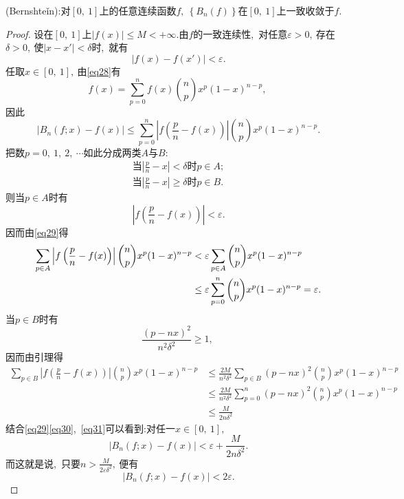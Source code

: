 \begin{theorem}
	(Bernshte\v{i}n):对$\left[0,\ 1\right]$上的任意连续函数$f,\ \left\{B_n(f)\right\}$在$\left[0,\ 1\right]$上一致收敛于$f.$
\end{theorem}
\begin{proof}
	设在$\left[0,\ 1\right]$上$|f(x)|\le M<+\infty.$由$f$的一致连续性,\ 对任意$\varepsilon>0,\ $存在$\delta>0,\ $使$|x-x'|<\delta$时,\ 就有
	$$|f(x)-f(x')|<\varepsilon.$$
	任取$x\in\left[0,\ 1\right],\ $由\eqref{eq28}有
	$$f(x)=\sum\limits_{p=0}^{n}f(x)\binom{n}{p}x^p(1-x)^{n-p},\ $$
	因此
	\begin{equation}
		\left|B_n(f;x)-f(x)\right|\le\sum_{p=0}^{n}\left|f\left(\frac{p}{n}-f(x)\right)\right|\binom{n}{p}x^p(1-x)^{n-p}.\label{eq29}
	\end{equation}
	把数$p=0,\ 1,\ 2,\ \cdots$如此分成两类$A$与$B:$
	\begin{align*}
		\text{当}\left|\frac{p}{n}-x\right|<\delta \text{时}p\in A;\\
		\text{当}\left|\frac{p}{n}-x\right|\ge\delta \text{时}p\in B.
	\end{align*}
	则当$p\in A$时有
	$$\left|f\left(\frac{p}{n}-f(x)\right)\right|<\varepsilon.$$
	因而由\eqref{eq29}得
	\begin{align}
		\sum\limits_{p\in A}^{}\left|f\left(\frac{p}{n}-f(x)\right)\right|\binom{n}{p}x^p(1-x)^{n-p}&<\varepsilon\sum\limits_{p\in A}^{}\binom{n}{p}x^p(1-x)^{n-p}{\nonumber}\\
		&\le\varepsilon\sum\limits_{p=0}^{n}\binom{n}{p}x^p(1-x)^{n-p}=\varepsilon.\label{eq30}
	\end{align}
	当$p\in B$时有
	$$\frac{(p-nx)^2}{n^2\delta^2}\ge 1,\ $$
	因而由引理得
	\begin{align}
		\sum\limits_{p\in B}^{}\left|f\left(\frac{p}{n}-f(x)\right)\right|\binom{n}{p}x^p(1-x)^{n-p}&\le\frac{2M}{n^2\delta^2}\sum\limits_{p\in B}^{}(p-nx)^2\binom{n}{p}x^p(1-x)^{n-p}\nonumber\\
		&\le\frac{2M}{n^2\delta^2}\sum\limits_{p=0}^{n}(p-nx)^2\binom{n}{p}x^p(1-x)^{n-p}\nonumber\\
		&\le\frac{M}{2n\delta^2}\label{eq31}
	\end{align}
	结合\eqref{eq29}\eqref{eq30},\ \eqref{eq31}可以看到:对任一$x\in\left[0,\ 1\right],\ $
	$$\left|B_n(f;x)-f(x)\right|<\varepsilon+\frac{M}{2n\delta^2}.$$
	而这就是说,\ 只要$n>\frac{M}{2\varepsilon\delta^2},\ $便有
	$$\left|B_n(f;x)-f(x)\right|<2\varepsilon.$$
\end{proof}
